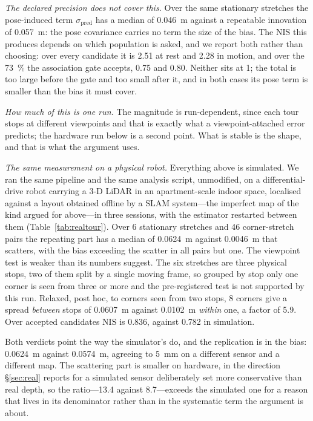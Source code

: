 \documentclass[conference,letterpaper,10pt]{IEEEtran}
\newcommand{\nis}{\ensuremath{\mathrm{NIS}}}
\begin{document}
\emph{The declared precision does not cover this.} Over the same stationary stretches the
pose-induced term $\sigma_{\text{pred}}$ has a median of \SI{0.046}{\meter} against a repeatable
innovation of \SI{0.057}{\meter}: the pose covariance carries no term the size of the bias. The
$\nis$ this produces depends on which population is asked, and we report both rather than choosing:
over every candidate it is \num{2.51} at rest and \num{2.28} in motion, and over the
\SI{73}{\percent} the association gate accepts, \num{0.75} and \num{0.80}. Neither sits at \num{1};
the total is too large before the gate and too small after it, and in both cases its pose term is
smaller than the bias it must cover.

\emph{How much of this is one run.} The magnitude is run-dependent, since each tour stops at
different viewpoints and that is exactly what a viewpoint-attached error predicts; the hardware run
below is a second point. What is stable is the shape, and that is what the argument uses.

\emph{The same measurement on a physical robot.} Everything above is simulated. We ran the same
pipeline and the same analysis script, unmodified, on a differential-drive robot carrying a
\num{3}-D LiDAR in an apartment-scale indoor space, localised against a layout obtained offline by a
SLAM system---the imperfect map of the kind argued for above---in three
sessions, with the estimator restarted between them (Table~\ref{tab:realtour}). Over \num{6}
stationary stretches and \num{46} corner-stretch pairs the repeating part has a median of
\SI{0.0624}{\meter} against \SI{0.0046}{\meter} that scatters, with the bias exceeding the scatter in
all pairs but one. The viewpoint test is weaker than its numbers suggest. The six stretches are
three physical stops, two of them split by a single moving frame, so grouped by stop only one corner
is seen from three or more and the pre-registered test is not supported by this run. Relaxed, post
hoc, to corners seen from two stops, \num{8} corners give a spread \emph{between} stops of
\SI{0.0607}{\meter} against \SI{0.0102}{\meter} \emph{within} one, a factor of \num{5.9}.
Over accepted candidates $\nis$ is \num{0.836}, against \num{0.782} in simulation.

Both verdicts point the way the simulator's do, and the replication is in the bias: \SI{0.0624}{\meter} against
\SI{0.0574}{\meter}, agreeing to \SI{5}{\milli\meter} on a different sensor and a different map. The
scattering part is smaller on hardware, in the direction \S\ref{sec:real} reports for a simulated
sensor deliberately set more conservative than real depth, so the ratio---\num{13.4} against
\num{8.7}---exceeds the simulated one for a reason that lives in its denominator rather than in the
systematic term the argument is about.
\end{document}
